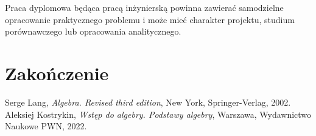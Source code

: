 \documentclass[magisterska]{pracadypl}
\begin{document}
Praca dyplomowa będąca pracą inżynierską powinna zawierać samodzielne opracowanie praktycznego problemu i może mieć charakter projektu, studium porównawczego lub opracowania analitycznego.




\chapter{Zakończenie}




\begin{thebibliography}{7}
%
Serge Lang, 
\textit{Algebra. Revised third edition}, 
New York, Springer-Verlag, 2002.
%
Aleksiej Kostrykin, 
\textit{Wstęp do algebry. Podstawy algebry},
Warszawa, Wydawnictwo Naukowe PWN, 2022.
\end{thebibliography}
\end{document}

